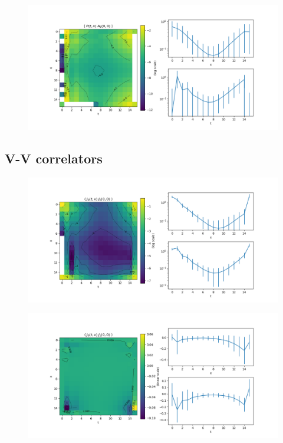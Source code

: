 \documentclass{article}
\begin{document}
\begin{figure}[H]
    \centering
    \includegraphics[width=\textwidth]{../plots/PA1.png}
    \caption{}
    \label{}
\end{figure}

\subsection{V-V correlators}

\begin{figure}[H]
    \centering
    \includegraphics[width=\textwidth]{../plots/V0V0.png}
    \caption{}
    \label{}
\end{figure}

\begin{figure}[H]
    \centering
    \includegraphics[width=\textwidth]{../plots/V0V1.png}
    \caption{}
    \label{}
\end{figure}
\end{document}
